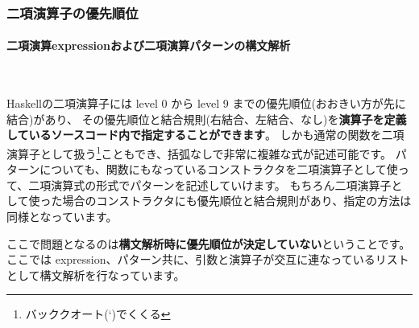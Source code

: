 \documentclass[mingoth,a4paper]{jsarticle}
\begin{document}

\subsubsection{二項演算子の優先順位}
\paragraph{二項演算expressionおよび二項演算パターンの構文解析} \ 

Haskellの二項演算子には level 0 から level 9 までの優先順位(おおきい方が先に結合)があり、
その優先順位と結合規則(右結合、左結合、なし)を{\bf 演算子を定義しているソースコード内で指定することができます}。
しかも通常の関数を二項演算子として扱う\footnote{バッククオート(`)でくくる}こともでき、括弧なしで非常に複雑な式が記述可能です。
パターンについても、関数にもなっているコンストラクタを二項演算子として使って、二項演算式の形式でパターンを記述していけます。
もちろん二項演算子として使った場合のコンストラクタにも優先順位と結合規則があり、指定の方法は同様となっています。

ここで問題となるのは{\bf 構文解析時に優先順位が決定していない}ということです。
ここでは expression、パターン共に、引数と演算子が交互に連なっているリストとして構文解析を行なっています。
\end{document}
